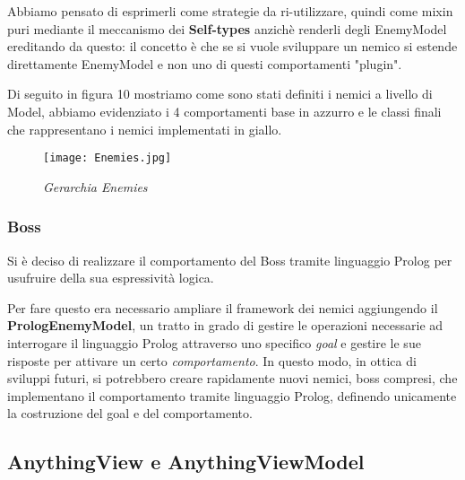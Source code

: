 Abbiamo pensato di esprimerli come strategie da ri-utilizzare, quindi come mixin puri mediante il meccanismo dei \textbf{Self-types} anzichè renderli degli EnemyModel ereditando da questo: il concetto è che se si vuole sviluppare un nemico si estende direttamente EnemyModel e non uno di questi comportamenti "plugin".

Di seguito in figura 10 mostriamo come sono stati definiti i nemici a livello di Model, abbiamo evidenziato i 4 comportamenti base in azzurro e le classi finali che rappresentano i nemici implementati in giallo.

\begin{figure}[!hbt]
    \centering
    \texttt{[image: Enemies.jpg]}
    \caption{\textit{Gerarchia Enemies}}
\end{figure}

\subsubsection{Boss}

Si è deciso di realizzare il comportamento del Boss tramite linguaggio Prolog per usufruire della sua espressività logica.

Per fare questo era necessario ampliare il framework dei nemici aggiungendo il \textbf{PrologEnemyModel}, 
un tratto in grado di gestire le operazioni necessarie ad interrogare il linguaggio Prolog attraverso uno specifico \textit{goal} 
e gestire le sue risposte per attivare un certo \textit{comportamento}.
In questo modo, in ottica di sviluppi futuri, si potrebbero creare rapidamente nuovi nemici, boss compresi, che implementano il comportamento tramite linguaggio Prolog, definendo unicamente la costruzione del goal e del comportamento.

\subsection{AnythingView e AnythingViewModel}
 
